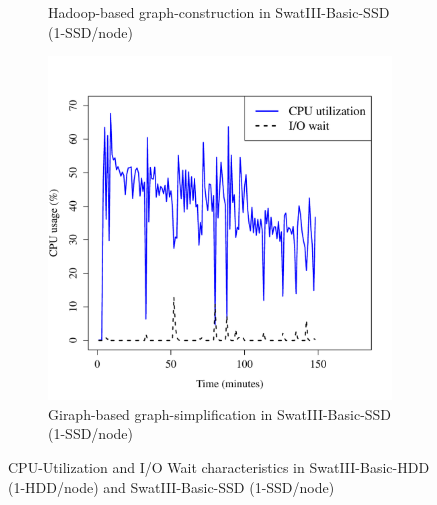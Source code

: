 \documentclass[conference]{IEEEtran}
\begin{document}
\begin{figure}[htb]
\begin{subfigure}[b]{0.23\textwidth}
                \caption{Hadoop-based graph-construction in SwatIII-Basic-SSD (1-SSD/node)}
                \label{fig:BGCPUSSD}
        \end{subfigure}    
        \begin{subfigure}[b]{0.23\textwidth}
                \includegraphics[width=\textwidth]{Figure/SystemData/Plots/ECCPUSSD.pdf}
                \caption{Giraph-based graph-simplification in SwatIII-Basic-SSD (1-SSD/node)}
                \label{fig:ECCPUSSD}
        \end{subfigure}
        \caption{CPU-Utilization and I/O Wait characteristics in SwatIII-Basic-HDD (1-HDD/node) and SwatIII-Basic-SSD (1-SSD/node)}\label{fig:HddSsdCPU}
        \vspace{-1.5em}
\end{figure}
\end{document}
